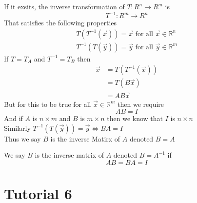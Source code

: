 \documentclass[11pt]{book}
\begin{document}
\begin{defn}\label{defn:inverse_transformation}
    If it exsits, the inverse transformation of $T : R^{n} \to R^{m} $ is 
    \begin{equation*}
        T^{-1} : R^{m} \to R^{n} 
    \end{equation*}
    That satisfies the following properties 
    \begin{gather*}
        T\left(T^{-1}\left(\vec{x}\right)\right) = \vec{x} \text{ for all  } \vec{x} \in \mathbb{R}^{n}\\
        T^{-1}\left(T\left(\vec{y}\right)\right) = \vec{y} \text{ for all } \vec{y} \in \mathbb{R}^{m}
    \end{gather*}
    If $T = T_{A}$ and $T^{-1} = T_{B}$ then
    \begin{align*}
        \vec{x} &=  T\left(T^{-1}\left(\vec{x}\right)\right) \\
        &= T\left(B\vec{x}\right) \\
        &= AB\vec{x}
    \end{align*}
    But for this to be true for all $\vec{x} \in \mathbb{R}^{m}$ then we require
    \begin{equation*}
        AB = I
    \end{equation*}
    And if $A$  is $n \times m$ and $B$  is $m \times n$ then we know that $I$  is $n \times n$ \\
    Similarly $T^{-1}\left(T\left(\vec{y}\right)\right) = \vec{y} \Leftrightarrow BA = I$ \\
    Thus we say $B$ is the inverse Matirx of $A$ denoted $B = A^{}$ 
\end{defn}
\begin{defn}\label{defn:inverse_matrix}
    We say $B$  is the inverse matrix of $A$ denoted $B = A^{-1}$ if
    \begin{equation*}
        AB = BA = I
    \end{equation*}
\end{defn}



\section{Tutorial 6}%
\label{sec:tutorial_6}
\end{document}
